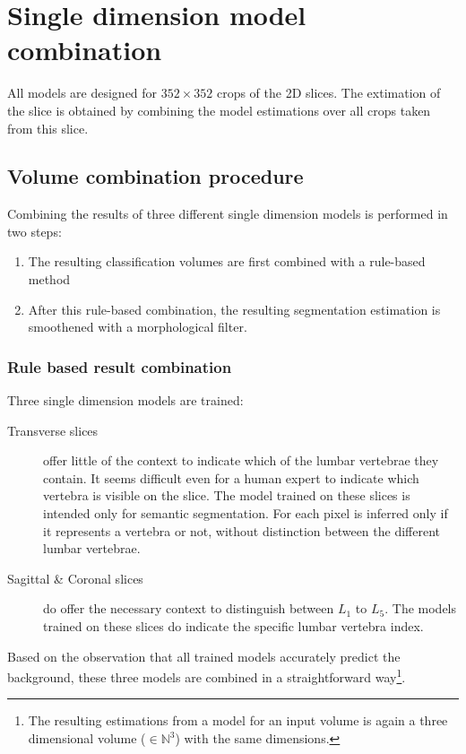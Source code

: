 
\chapter{Single dimension model combination}

All models are designed for $352 \times 352$ crops of the 2D slices.
The extimation of the slice is obtained by combining the model estimations over all crops taken from this slice.

\section{Volume combination procedure}

Combining the results of three different single dimension models is performed in two steps:
\begin{enumerate}
    \item The resulting classification volumes are first combined with a rule-based method
    \item After this rule-based combination, the resulting segmentation estimation is smoothened with a morphological filter.
\end{enumerate}

\subsection{Rule based result combination}
Three single dimension models are trained:
\begin{description}
    \item[Transverse slices] offer little of the context to indicate which of the lumbar vertebrae they contain. 
    It seems difficult even for a human expert to indicate which vertebra is visible on the slice.
    The model trained on these slices is intended only for semantic segmentation.
    For each pixel is inferred only if it represents a vertebra or not, without distinction between the different lumbar vertebrae. 
    \item[Sagittal \& Coronal slices] do offer the necessary context to distinguish between $L_1$ to $L_5$. 
    The models trained on these slices do indicate the specific lumbar vertebra index. 
\end{description}

Based on the observation that all trained models accurately predict the background, these three models are combined in a straightforward way\footnote{
    The resulting estimations from a model for an input volume is again a three dimensional volume ($\in \mathbb{N}^3$) with the same dimensions.
}.

